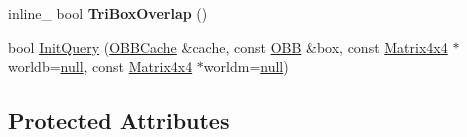 \begin{DoxyCompactItemize}
\item 
inline\+\_\+ bool {\bfseries Tri\+Box\+Overlap} ()\hypertarget{classOpcode_1_1OBBCollider_a7068814687193306c7345594eb3d37df}{}\label{classOpcode_1_1OBBCollider_a7068814687193306c7345594eb3d37df}

\item 
bool \hyperlink{classOpcode_1_1OBBCollider_af81f1695a936b065f61add104fc4603a}{Init\+Query} (\hyperlink{structOpcode_1_1OBBCache}{O\+B\+B\+Cache} \&cache, const \hyperlink{classOpcode_1_1OBB}{O\+BB} \&box, const \hyperlink{classOpcode_1_1Matrix4x4}{Matrix4x4} $\ast$worldb=\hyperlink{IceTypes_8h_ac97b8ee753e4405397a42ad5799b0f9e}{null}, const \hyperlink{classOpcode_1_1Matrix4x4}{Matrix4x4} $\ast$worldm=\hyperlink{IceTypes_8h_ac97b8ee753e4405397a42ad5799b0f9e}{null})
\end{DoxyCompactItemize}
\subsection*{Protected Attributes}
